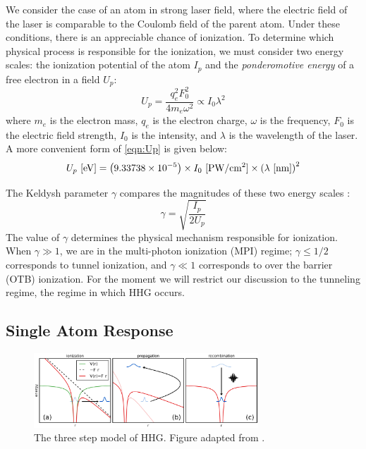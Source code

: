 We consider the case of an atom in strong laser field, where the electric field of the laser is comparable to the Coulomb field of the parent atom. Under these conditions, there is an appreciable chance of ionization. To determine which physical process is responsible for the ionization, we must consider two energy scales: the ionization potential of the atom $I_p$ and the \textit{ponderomotive energy} of a free electron in a field $U_p$:
\begin{equation}
U_p = \frac{q_e^2 F_0^2}{4 m_e \omega^2} \propto I_0 \lambda^2
\label{eqn:Up}
\end{equation}
where $m_e$ is the electron mass, $q_e$ is the electron charge, $\omega$ is the frequency, $F_0$ is the electric field strength, $I_0$ is the intensity, and $\lambda$ is the wavelength of the laser. A more convenient form of \cref{eqn:Up} is given below:
\begin{equation}
U_p \textrm{ [eV]} = \left( 9.33738 \times 10^{-5} \right) \times I_0 \ \textrm{[PW/cm\textsuperscript{2}]} \times \left(\lambda \ \textrm{[nm]} \right)^2
\label{eqn:Up-numbers}
\end{equation}

The Keldysh parameter $\gamma$ compares the magnitudes of these two energy scales \cite{keldyshIonizationFieldStrong1965}:
\begin{equation}
\gamma = \sqrt{\frac{I_p}{2 U_p}}
\end{equation}
The value of $\gamma$ determines the physical mechanism responsible for ionization. When ${\gamma \gg 1}$, we are in the multi-photon ionization (MPI) regime; ${\gamma \le 1/2}$ corresponds to tunnel ionization, and ${\gamma \ll 1}$ corresponds to over the barrier (OTB) ionization. For the moment we will restrict our discussion to the tunneling regime, the regime in which HHG occurs.

%
%
%
%

\subsection{Single Atom Response}
\label{sec:single-atom-response}

\begin{figure}
	\centering
	\includegraphics[width=0.75\textwidth]{figures/chap1/ThreeStepModel.png}
	\caption{The three step model of HHG. Figure adapted from \cite{schounAttosecondHighHarmonicSpectroscopy2015}.}
	\label{fig:ThreeStepModel}
\end{figure}

